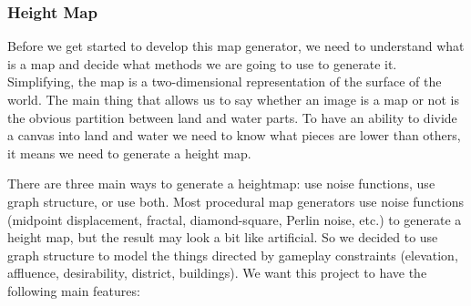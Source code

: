 \subsubsection{Height Map}
\label{sec:Design>Map Generator Design>Height Map}
Before we get started to develop this map generator, we need to understand what is a map and decide what methods we are going to use to generate it. Simplifying, the map is a two-dimensional representation of the surface of the world.
The main thing that allows us to say whether an image is a map or not is the obvious partition between land and water parts. To have an ability to divide a canvas into land and water we need to know what pieces are lower than others, it means we need to generate a height map.

There are three main ways to generate a heightmap: use noise functions, use graph structure, or use both. Most procedural map generators use noise functions (midpoint displacement, fractal, diamond-square, Perlin noise, etc.) to generate a height map, but the result may look a bit like artificial. So we decided to use graph structure to model the things directed by gameplay constraints (elevation, affluence, desirability, district, buildings). We want this project to have the following main features:

